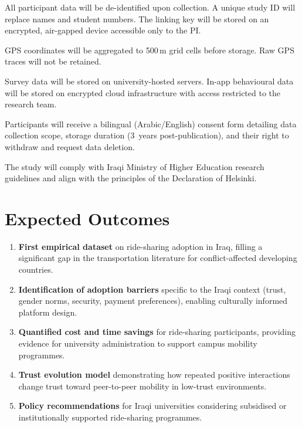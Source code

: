 \documentclass[12pt,a4paper]{article}
\begin{document}
\begin{description}[style=nextline, font=\bfseries]
  \item[Anonymisation] All participant data will be de-identified upon collection. A unique study ID will replace names and student numbers. The linking key will be stored on an encrypted, air-gapped device accessible only to the PI.
  \item[Location privacy] GPS coordinates will be aggregated to 500\,m grid cells before storage. Raw GPS traces will not be retained.
  \item[Data storage] Survey data will be stored on university-hosted servers. In-app behavioural data will be stored on encrypted cloud infrastructure with access restricted to the research team.
  \item[Informed consent] Participants will receive a bilingual (Arabic/English) consent form detailing data collection scope, storage duration (3~years post-publication), and their right to withdraw and request data deletion.
  \item[Compliance] The study will comply with Iraqi Ministry of Higher Education research guidelines and align with the principles of the Declaration of Helsinki.
\end{description}

\section{Expected Outcomes}
\label{sec:outcomes}

\begin{enumerate}[nosep]
  \item \textbf{First empirical dataset} on ride-sharing adoption in Iraq, filling a significant gap in the transportation literature for conflict-affected developing countries.
  \item \textbf{Identification of adoption barriers} specific to the Iraqi context (trust, gender norms, security, payment preferences), enabling culturally informed platform design.
  \item \textbf{Quantified cost and time savings} for ride-sharing participants, providing evidence for university administration to support campus mobility programmes.
  \item \textbf{Trust evolution model} demonstrating how repeated positive interactions change trust toward peer-to-peer mobility in low-trust environments.
  \item \textbf{Policy recommendations} for Iraqi universities considering subsidised or institutionally supported ride-sharing programmes.
\end{enumerate}
\end{document}
